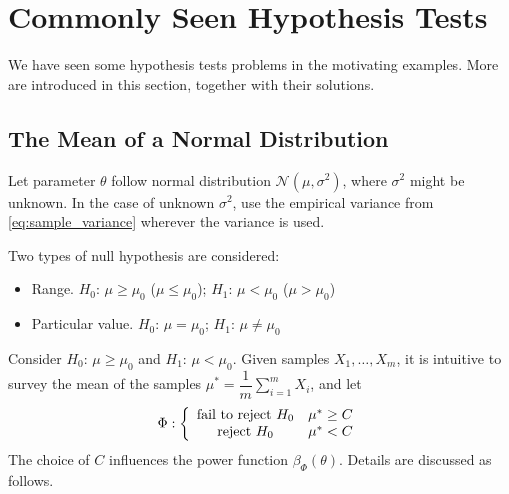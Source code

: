 \section{Commonly Seen Hypothesis Tests}

We have seen some hypothesis tests problems in the motivating examples. More are introduced in this section, together with their solutions.

\subsection{The Mean of a Normal Distribution}

Let parameter $\theta$ follow normal distribution $\mathcal{N}(\mu,\sigma^2)$, where $\sigma^2$ might be unknown. In the case of unknown $\sigma^2$, use the empirical variance from \eqref{eq:sample_variance} wherever the variance is used.

Two types of null hypothesis are considered:
\begin{itemize}
	\item Range. $H_0$: $\mu \geq \mu_0$ ($\mu \leq \mu_0$); $H_1$: $\mu < \mu_0$ ($\mu > \mu_0$)
	\item Particular value. $H_0$: $\mu = \mu_0$; $H_1$: $\mu \neq \mu_0$
\end{itemize}

Consider $H_0$: $\mu \geq \mu_0$ and  $H_1$: $\mu < \mu_0$. Given samples $X_1,\ldots,X_m$, it is intuitive to survey the mean of the samples $\mu^*=\dfrac{1}{m}\sum_{i=1}^{m}X_i$, and let
\begin{eqnarray}
	\Phi : \left\{\begin{array}{cc}
		\textup{fail to reject~} H_0 & \mu^* \geq C \\
		\textup{reject~} H_0 & \mu^* < C
	\end{array}\right. \label{eq:hypotest_normal_1}
\end{eqnarray}
The choice of $C$ influences the power function $\beta_{\Phi}(\theta)$. Details are discussed as follows.

